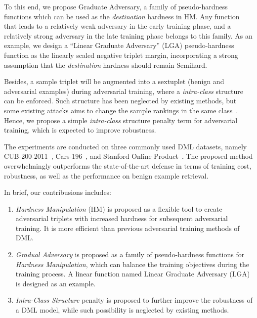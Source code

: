 \documentclass[10pt,twocolumn,letterpaper]{article}
\begin{document}

To this end, we propose Graduate Adversary, a family of pseudo-hardness
functions which can be used as the \emph{destination} hardness in HM.
%
Any function that leads to a relatively weak adversary in the early training
phase, and a relatively strong adversary in the late training phase belongs to
this family.
%
As an example, we design a ``Linear Graduate Adversary'' (LGA) pseudo-hardness
function as the linearly scaled negative triplet margin, incorporating a strong
assumption that the \emph{destination} hardness should remain Semihard.
%


Besides, a sample triplet will be augmented into a sextuplet (benign and
adversarial examples) during adversarial training, where a \emph{intra-class}
structure can be enforced.
%
Such structure has been neglected by existing methods, but some existing
attacks aims to change the sample rankings in the same class~\cite{advrank}.
%
Hence, we propose a simple \emph{intra-class} structure penalty term for
adversarial training, which is expected to improve robustness.

The experiments are conducted on three commonly used DML datasets, namely
CUB-200-2011~\cite{cub200}, Cars-196~\cite{cars196}, and Stanford Online
Product~\cite{sop}.
%
The proposed method overwhelmingly outperforms the state-of-the-art defense in
terms of training cost, robustness, as well as the performance on benign
example retrieval.

In brief, our contribusions includes:
%
\begin{enumerate}[nosep, noitemsep, leftmargin=*]
	\item {\textit{Hardness Manipulation}} (HM) is proposed as a flexible tool
		to create adversarial triplets with increased hardness for
		subsequent adversarial training.
		It is more efficient than previous adversarial training methods of DML.
	\item \textit{Gradual Adversary} is proposed as a family of pseudo-hardness
		functions for \emph{Hardness Manipulation}, which can balance the
		training objectives during the training process.
		A linear function named Linear Graduate Adversary (LGA) is designed as
		an example.
	\item \textit{Intra-Class Structure} penalty is proposed to further improve
		the robustness of a DML model, while such possibility is neglected by
		existing methods. 
\end{enumerate}
\end{document}
